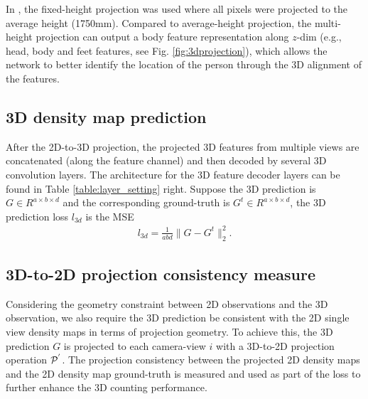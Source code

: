 \documentclass[letterpaper]{article} %
\newcommand{\NOTE}[1]{\textcolor{black}{}}
\newcommand{\ZQ}[1]{\textcolor{black}{}} %
\newcommand{\citealp}[1]{\citeauthor{#1} \citeyear{#1}}
\begin{document}
\par
In \citealp{zhang2019wide}, the fixed-height projection was used where all pixels were projected to the average height (1750mm). Compared to average-height projection, the multi-height projection can output a body feature representation along $z$-dim (e.g., head, body and feet features, see Fig. \ref{fig:3dprojection}), which allows the network to better identify the location of the person through the 3D alignment of the features.


\subsection{3D density map prediction}
After the 2D-to-3D projection, the projected 3D features from multiple views are concatenated (along the feature channel) and then decoded by several 3D convolution layers.
The architecture for the 3D feature decoder layers can be found in Table \ref{table:layer_setting} right.
Suppose the 3D prediction is $G \in {R^{a \times b \times d}} $ and the corresponding ground-truth is $G^t \in {R^{a \times b \times d}}$, the 3D prediction loss $l_{3d}$ is the MSE
\begin{align}
  l_{3d} = \frac{1}{abd} \parallel G - G^t \parallel _2^2.
\end{align}





\subsection{3D-to-2D projection consistency measure}
\par
Considering the geometry constraint between 2D observations and the 3D observation, we also require the 3D prediction be consistent with the 2D single view density maps in terms of projection geometry. To achieve this, the 3D prediction $G$ is projected to each camera-view $i$ with a 3D-to-2D projection operation ${\cal P}^{'}$. The projection consistency between the projected 2D density maps and the 2D density map ground-truth is measured and used as part of the loss to further enhance the 3D counting performance.
\end{document}
